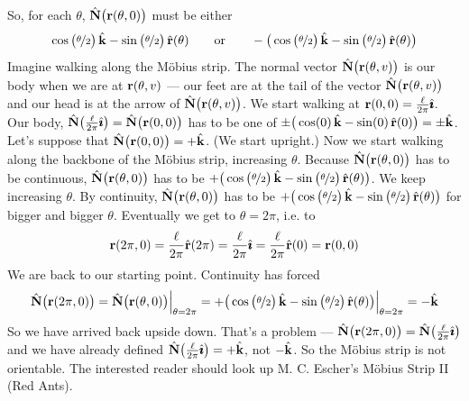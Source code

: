 \begin{eg}
\begin{equation*}
\end{equation*}
So, for each $\theta$, $\hat{\mathbf{N}}\big(\mathbf{r}(\theta,0)\big)$ must be either 
\begin{equation*}
\cos\big(\nicefrac{\theta}{2}\big)\,\hat{\mathbf{k}}
                       -\sin\big(\nicefrac{\theta}{2}\big)\,\hat{\mathbf{r}}(\theta)
\qquad\text{or}\qquad 
-\big(\cos\big(\nicefrac{\theta}{2}\big)\,\hat{\mathbf{k}}
                       -\sin\big(\nicefrac{\theta}{2}\big)\,\hat{\mathbf{r}}(\theta) \big)
\end{equation*}
Imagine walking along the M\"obius strip.
The normal vector $\hat{\mathbf{N}}\big(\mathbf{r}(\theta,v)\big)$ is our body when we are 
at $\mathbf{r}(\theta,v)$ --- our feet are at the tail of the vector 
$\hat{\mathbf{N}}\big(\mathbf{r}(\theta,v)\big)$ and our head is at the arrow of 
$\hat{\mathbf{N}}\big(\mathbf{r}(\theta,v)\big)$. We start walking at 
$\mathbf{r}(0,0)=\frac{\ell}{2\pi}\hat{\pmb{\imath}}$. Our body,
$\hat{\mathbf{N}}\big(\frac{\ell}{2\pi}\hat{\pmb{\imath}}\big)=\hat{\mathbf{N}}\big(\mathbf{r}(0,0)\big)$ has to be one of 
$\pm \big(\cos(0)\,\hat{\mathbf{k}}-\sin(0)\,\hat{\mathbf{r}}(0) \big)=\pm\hat{\mathbf{k}}$. 
Let's suppose that $\hat{\mathbf{N}}\big(\mathbf{r}(0,0)\big)=+\hat{\mathbf{k}}$. (We start upright.)
Now we start walking along the backbone of the M\"obius strip, 
increasing $\theta$. Because $\hat{\mathbf{N}}\big(\mathbf{r}(\theta,0)\big)$ has to be continuous, 
$\hat{\mathbf{N}}\big(\mathbf{r}(\theta,0)\big)$ has to be 
$+\big(\cos\big(\nicefrac{\theta}{2}\big)\,\hat{\mathbf{k}}
                       -\sin\big(\nicefrac{\theta}{2}\big)\,\hat{\mathbf{r}}(\theta) \big)$.
We keep increasing $\theta$. By continuity, $\hat{\mathbf{N}}\big(\mathbf{r}(\theta,0)\big)$ has to be 
$+\big(\cos\big(\nicefrac{\theta}{2}\big)\,\hat{\mathbf{k}}
                       -\sin\big(\nicefrac{\theta}{2}\big)\,\hat{\mathbf{r}}(\theta) \big)$
for bigger and bigger $\theta$. Eventually we get to $\theta=2\pi$, i.e. to
\begin{equation*}
\mathbf{r}(2\pi,0)= \frac{\ell}{2\pi}\hat{\mathbf{r}}(2\pi) =  \frac{\ell}{2\pi}\hat{\pmb{\imath}}
=\frac{\ell}{2\pi}\hat{\mathbf{r}}(0)=\mathbf{r}(0,0)
\end{equation*}
We are back to our starting point. Continuity has forced
\begin{equation*}
\hat{\mathbf{N}}\big(\mathbf{r}(2\pi,0)\big)
=\hat{\mathbf{N}}\big(\mathbf{r}(\theta,0)\big)\Big|_{\theta=2\pi}
=+\big(\cos\big(\nicefrac{\theta}{2}\big)\,\hat{\mathbf{k}}
                       -\sin\big(\nicefrac{\theta}{2}\big)\,\hat{\mathbf{r}}(\theta) \big)
\Big|_{\theta=2\pi}
=-\hat{\mathbf{k}}
\end{equation*}
So we have arrived back upside down.
That's a problem --- $\hat{\mathbf{N}}\big(\mathbf{r}(2\pi,0)\big)
=\hat{\mathbf{N}}\big(\frac{\ell}{2\pi}\hat{\pmb{\imath}}\big)$
and we have already defined $\hat{\mathbf{N}}\big(\frac{\ell}{2\pi}\hat{\pmb{\imath}}\big)=+\hat{\mathbf{k}}$, not $-\hat{\mathbf{k}}$. So the M\"obius strip is not orientable. The interested reader
should look up M. C. Escher's M\"obius Strip II (Red Ants).

\end{eg}









